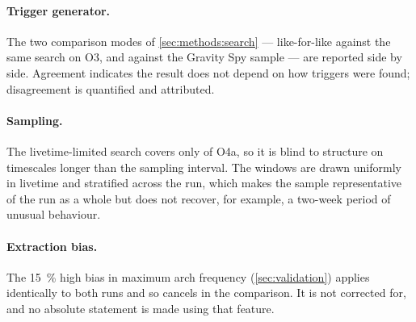 \paragraph{Trigger generator.} The two comparison modes of
\cref{sec:methods:search} --- like-for-like against the same search on O3, and
against the Gravity Spy sample --- are reported side by side. Agreement
indicates the result does not depend on how triggers were found; disagreement
is quantified and attributed.

\paragraph{Sampling.} The livetime-limited search covers only
\ResultCoverageOFoura{} of O4a, so it is blind to structure on timescales longer than the
sampling interval. The windows are drawn uniformly in livetime and stratified
across the run, which makes the sample representative of the run as a whole
but does not recover, for example, a two-week period of unusual behaviour.

\paragraph{Extraction bias.} The \SI{15}{\percent} high bias in maximum arch
frequency (\cref{sec:validation}) applies identically to both runs and so
cancels in the comparison. It is not corrected for, and no absolute statement
is made using that feature.
